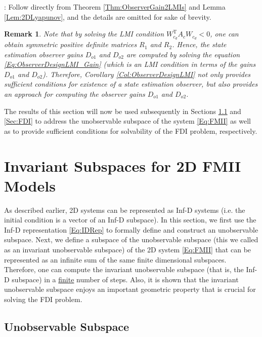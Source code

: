\documentclass[journal,12pt,draftcls,onecolumn]{IEEEtran}
\newcommand{\tran}{\mathrm{T}}
\newcommand{\infd}{Inf-D }
\def\QEDclosed{\hfill\IEEEQEDclosed}
\renewcommand{\qed}{\QEDclosed}
\renewenvironment{proof}[1][\proofname]{\noindent\nobreakspace{\bfseries #1}:\;}{\qed\par}
\newtheorem{remark}{Remark}
\begin{document}
\begin{proof}
	Follow directly from Theorem \ref{Thm:ObserverGain2LMIs} and Lemma \ref{Lem:2DLyapunov}, and the details are omitted for sake of brevity.
\end{proof}
\begin{remark}\label{Rem:ObserverLMIConstructive}
	Note that by solving the LMI condition $W_{c_d}^\tran A_c W_{c_d}<0$, one can obtain symmetric  positive definite matrices $R_1$ and $R_2$. Hence, the state estimation observer gains $D_{o1}$ and $D_{o2}$ are computed by solving the equation \eqref{Eq:ObserverDesignLMI_Gain} (which is an LMI condition in terms of the gains $D_{o1}$ and $D_{o2}$). Therefore, Corollary \ref{Col:ObserverDesignLMI} not only provides sufficient conditions for existence of a state estimation observer, but also provides an approach for computing the observer gains $D_{o1}$ and $D_{o2}$. \qed
\end{remark}
The results of this section will now be used subsequently in Sections \ref{Sec:UnObservable} and \ref{Sec:FDI} to address the unobservable subspace of the system \eqref{Eq:FMII} as well as to provide sufficient conditions for  solvability of the FDI problem, respectively.


\section{Invariant Subspaces for 2D FMII Models}\label{Sec:InvSpace}
As described earlier, 2D systems can be represented as \infd systems (i.e. the initial condition is a vector of an Inf-D subspace). In this section, we first use the Inf-D representation \eqref{Eq:IDRep} to formally define and construct an unobservable subspace. Next, we define a subspace of  the unobservable subspace  (this we called as an invariant unobservable subspace) of the 2D system \eqref{Eq:FMII} that can be represented as an infinite sum of the same finite dimensional subspaces. Therefore, one can compute the invariant unobservable subspace (that is, the \infd subspace) in a \underline{finite} number of steps. Also, it is shown that the invariant unobservable subspace enjoys an important geometric property that is crucial for solving the FDI problem.



\subsection{Unobservable Subspace}\label{Sec:UnObservable}
\end{document}
